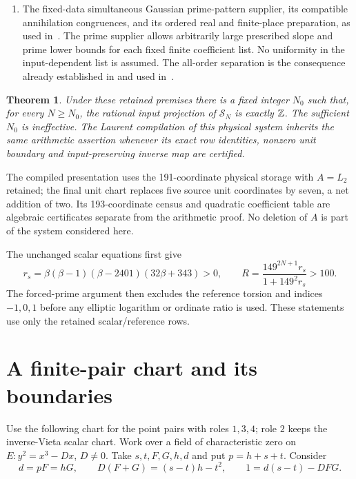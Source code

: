 \documentclass[11pt,a4paper]{article}
\newtheorem{theorem}[proposition]{Theorem}
\begin{document}
\begin{enumerate}
$2,3,17$ have been established. Its analytic and arithmetic foundations
are included in this retained interface.
\item The fixed-data simultaneous Gaussian prime-pattern supplier,
its compatible annihilation congruences, and its ordered real and
finite-place preparation, as used in~\cite{InverseVieta,Uniform}.
The prime supplier allows arbitrarily large prescribed slope and
prime lower bounds for each fixed finite coefficient list. No
uniformity in the input-dependent list is assumed.
The all-order separation is the consequence already established in
\cite[Theorem 2.2]{PrimeSeparation} and used in~\cite[P16]{Uniform}.
\end{enumerate}

\begin{theorem}\label{thm:arithmetic}
Under these retained premises there is a fixed integer $N_0$ such
that, for every $N\ge N_0$, the rational input projection of
$\mathcal S_N$ is exactly $\mathbb Z$. The sufficient $N_0$ is ineffective.
The Laurent compilation of this physical system inherits the same
arithmetic assertion whenever its exact row identities, nonzero unit
boundary and input-preserving inverse map are certified.
\end{theorem}

The compiled presentation uses the 191-coordinate physical storage
with $A=L_2$ retained; the final unit chart replaces five source unit
coordinates by seven, a net addition of two. Its
193-coordinate census and quadratic coefficient table are algebraic
certificates separate from the arithmetic proof. No deletion of $A$
is part of the system considered here.

The unchanged scalar equations first give
\[
 r_s=\beta(\beta-1)(\beta-2401)(32\beta+343)>0,\qquad
 R=\frac{149^{2N+1}r_s}{1+149^2r_s}>100.
\]
The forced-prime argument then excludes the reference torsion and
indices $-1,0,1$ before any elliptic logarithm or ordinate ratio is
used. These statements use only the retained scalar/reference rows.

\section{A finite-pair chart and its boundaries}

Use the following chart for the point pairs with roles $1,3,4$;
role $2$ keeps the inverse-Vieta scalar chart.
Work over a field of characteristic zero on $E:y^2=x^3-Dx$, $D\ne0$.
Take $s,t,F,G,h,d$ and put $p=h+s+t$. Consider
\begin{equation}\label{eq:chart}
 d=pF=hG,\qquad D(F+G)=(s-t)h-t^2,\qquad
                       1=d(s-t)-DFG.
\end{equation}
\end{document}
